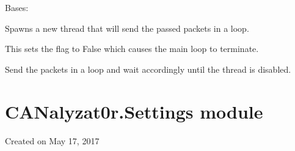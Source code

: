 \documentclass[letterpaper,10pt,english]{sphinxmanual}
\begin{document}
\begin{fulllineitems}
\label{\detokenize{src:src.SenderThread.LoopSenderThread}}
Bases: 

Spawns a new thread that will send the passed packets in a loop.

\begin{fulllineitems}
\label{\detokenize{src:src.SenderThread.LoopSenderThread.__init__}}
\end{fulllineitems}


\begin{fulllineitems}
\label{\detokenize{src:src.SenderThread.LoopSenderThread.disable}}
This sets the  flag to False which causes the main loop to terminate.

\end{fulllineitems}


\begin{fulllineitems}
\label{\detokenize{src:src.SenderThread.LoopSenderThread.run}}
Send the packets in a loop and wait accordingly until the thread is disabled.

\end{fulllineitems}


\begin{fulllineitems}
\label{\detokenize{src:src.SenderThread.LoopSenderThread.staticMetaObject}}
\end{fulllineitems}


\end{fulllineitems}



\section{CANalyzat0r.Settings module}
\label{\detokenize{src:canalyzat0r-settings-module}}\label{\detokenize{src:module-src.Settings}}
Created on May 17, 2017
\end{document}
